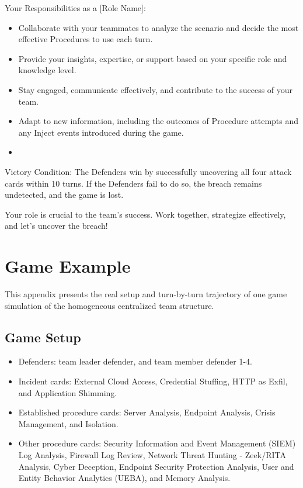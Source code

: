\documentclass[letterpaper]{article} %
\begin{document}
Your Responsibilities as a [Role Name]:
\begin{itemize}
    \item Collaborate with your teammates to analyze the scenario and decide the most effective Procedures to use each turn.
    \item Provide your insights, expertise, or support based on your specific role and knowledge level.
    \item Stay engaged, communicate effectively, and contribute to the success of your team.
    \item Adapt to new information, including the outcomes of Procedure attempts and any Inject events introduced during the game.
    \item[] [Role Responsibilities]
\end{itemize}

Victory Condition: The Defenders win by successfully uncovering all four attack cards within 10 turns. If the Defenders fail to do so, the breach remains undetected, and the game is lost.

Your role is crucial to the team's success. Work together, strategize effectively, and let's uncover the breach!

\section{Game Example}
\label{sec:game-example}

This appendix presents the real setup and turn-by-turn trajectory of one game simulation of the homogeneous centralized team structure.

\subsection{Game Setup}

\begin{itemize}
    \item Defenders: team leader defender, and team member defender 1-4.
    \item Incident cards: External Cloud Access, Credential Stuffing, HTTP as Exfil, and Application Shimming.
    \item Established procedure cards: Server Analysis, Endpoint Analysis, Crisis Management, and Isolation.
    \item Other procedure cards: Security Information and Event Management (SIEM) Log Analysis, Firewall Log Review, Network Threat Hunting - Zeek/RITA Analysis, Cyber Deception, Endpoint Security Protection Analysis, User and Entity Behavior Analytics (UEBA), and Memory Analysis.
\end{itemize}
\end{document}
